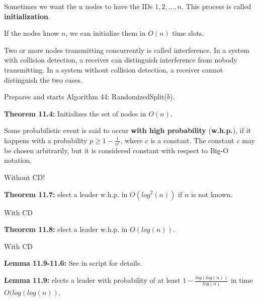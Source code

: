 {
	Sometimes we want the n nodes to have the IDs ${1, 2, \ldots , n}$. This process is 
	called {\bf initialization}.
}

{
	If the nodes know $n$, we can initialize them in $O(n)$ time slots.
}

{
	Two or more nodes transmitting concurrently is called interference. In a system with collision detection, a 
	receiver can distinguish interference from nobody transmitting. In a system without collision detection, a 
	receiver cannot distinguish the two cases.
}

{
}

{
	\begin{items}
		\item Prepares and starts Algorithm 44: RandomizedSplit($b$).
		\item {\bf Theorem 11.4:} Initializes the set of nodes in $O(n)$.
	\end{items}
}

{
	Some probabilistic event is said to occur {\bf with high probability} ({\bf w.h.p.}), if it happens with 
	a probability $p \ge 1-\frac{1}{n^c}$, where $c$ is a constant. The constant $c$ may be chosen arbitrarily, but it is 
	considered constant with respect to Big-O notation.
}

{
	\begin{items}
		\item Without CD!
		\item {\bf Theorem 11.7:} elect a leader w.h.p. in $O(log^2(n))$ if $n$ is not known.
	\end{items}
}

{
	\begin{items}
		\item With CD
		\item {\bf Theorem 11.8:} elect a leader w.h.p. in $O(log(n))$.
	\end{items}
}

{
	\begin{items}
		\item With CD
		\item {\bf Lemma 11.9-11.6:} See in script for details.
		\item {\bf Lemma 11.9:} elects a leader with probability of at least $1-\frac{log(log(n))}{log(n)}$ 
		in time $O(log(log(n))$.
	\end{items}
}


